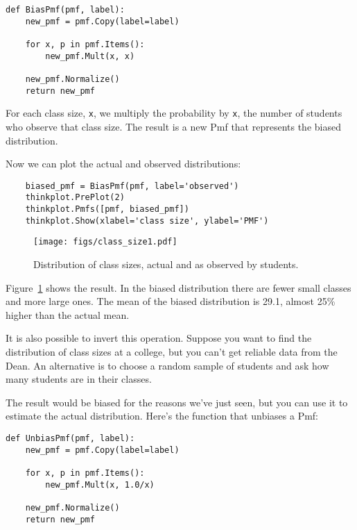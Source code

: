 \documentclass[12pt]{book}
\begin{document}
\begin{verbatim}
def BiasPmf(pmf, label):
    new_pmf = pmf.Copy(label=label)

    for x, p in pmf.Items():
        new_pmf.Mult(x, x)
        
    new_pmf.Normalize()
    return new_pmf
\end{verbatim}

For each class size, {\tt x}, we multiply the probability by
{\tt x}, the number of students who observe that class size.
The result is a new Pmf that represents the biased distribution.

Now we can plot the actual and observed distributions:

\begin{verbatim}
    biased_pmf = BiasPmf(pmf, label='observed')
    thinkplot.PrePlot(2)
    thinkplot.Pmfs([pmf, biased_pmf])
    thinkplot.Show(xlabel='class size', ylabel='PMF')
\end{verbatim}

\begin{figure}
\centerline{\texttt{[image: figs/class\_size1.pdf]}}
\caption{Distribution of class sizes, actual and as observed by students.}
\label{class_size1}
\end{figure}

Figure~\ref{class_size1} shows the result.  In the biased distribution
there are fewer small classes and more large ones.
The mean of the biased distribution is 29.1, almost 25\% higher
than the actual mean.

It is also possible to invert this operation.  Suppose you want to
find the distribution of class sizes at a college, but you can't get
reliable data from the Dean.  An alternative is to choose a random
sample of students and ask how many students are in their
classes.   

The result would be biased for the reasons we've just seen, but you
can use it to estimate the actual distribution.  Here's the function
that unbiases a Pmf:

\begin{verbatim}
def UnbiasPmf(pmf, label):
    new_pmf = pmf.Copy(label=label)

    for x, p in pmf.Items():
        new_pmf.Mult(x, 1.0/x)
        
    new_pmf.Normalize()
    return new_pmf
\end{verbatim}
\end{document}
